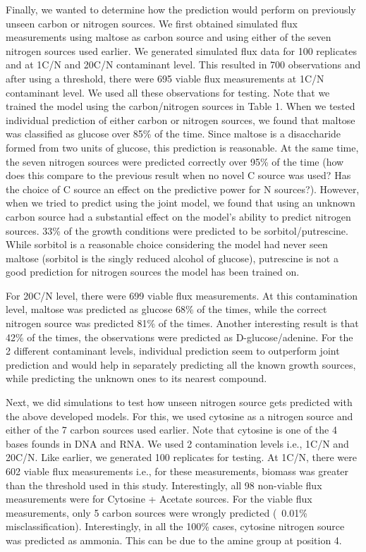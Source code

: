 \documentclass[12pt]{article}
\begin{document}
Finally, we wanted to determine how the prediction would perform on previously unseen carbon or nitrogen sources. We first obtained simulated flux measurements using maltose as carbon source and using either of the seven nitrogen sources used earlier. We generated simulated flux data for 100 replicates and at 1C/N and 20C/N contaminant level. This resulted in 700 observations and after using a threshold, there were 695 viable flux measurements at 1C/N contaminant level. We used all these observations for testing. Note that we trained the model using the carbon/nitrogen sources in Table 1. When we tested individual prediction of either carbon or nitrogen sources, we found that maltose was classified as glucose over 85\% of the time. Since maltose is a disaccharide formed from two units of glucose, this prediction is reasonable. At the same time, the seven nitrogen sources were predicted correctly over 95\% of the time ({\color{red}how does this compare to the previous result when no novel C source was used? Has the choice of C source an effect on the predictive power for N sources?}). However, when we tried to predict using the joint model, we found that using an unknown carbon source had a substantial effect on the model's ability to predict nitrogen sources. 33\% of the growth conditions were predicted to be sorbitol/putrescine. While sorbitol is a reasonable choice considering the model had never seen maltose (sorbitol is the singly reduced alcohol of glucose), putrescine is not a good prediction for nitrogen sources the model has been trained on.

For 20C/N level, there were 699 viable flux measurements. At this contamination level, maltose was predicted as glucose 68\% of the times, while the correct nitrogen source was predicted 81\% of the times. Another interesting result is that 42\% of the times, the observations were predicted as D-glucose/adenine. For the 2 different contaminant levels, individual prediction seem to outperform joint prediction and would help in separately predicting all the known growth sources, while predicting the unknown ones to its nearest compound.

Next, we did simulations to test how unseen nitrogen source gets predicted with the above developed models. For this, we used cytosine as a nitrogen source and either of the 7 carbon sources used earlier. Note that cytosine is one of the 4 bases founds in DNA and RNA. We used 2 contamination levels i.e., 1C/N and 20C/N. Like earlier, we generated 100 replicates for testing. At 1C/N, there were 602 viable flux measurements i.e., for these measurements, biomass was greater than the threshold used in this study. Interestingly, all 98 non-viable flux measurements were for Cytosine + Acetate sources. For the viable flux measurements, only 5 carbon sources were wrongly predicted (~0.01\% misclassification). Interestingly, in all the 100\% cases, cytosine nitrogen source was predicted as ammonia. This can be due to the amine group at position 4.
\end{document}
